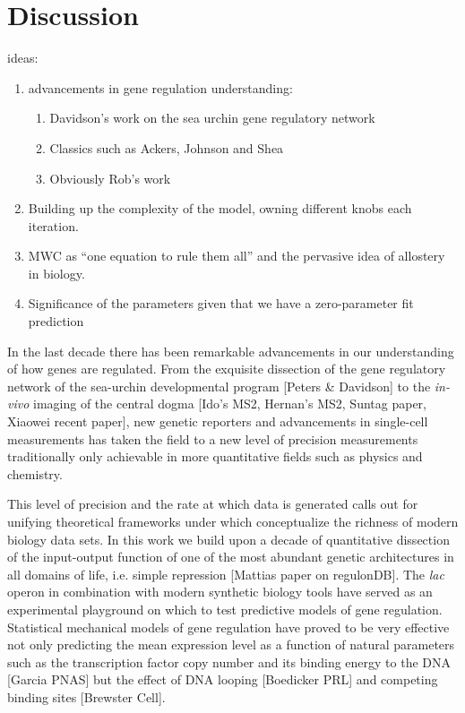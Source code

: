 \pagebreak
\section*{Discussion }

ideas:
\begin{enumerate}
  \item advancements in gene regulation understanding:
    \begin{enumerate}
      \item Davidson's work on the sea urchin gene regulatory network
      \item Classics such as Ackers, Johnson and Shea
      \item Obviously Rob's work
    \end{enumerate}
  \item Building up the complexity of the model, owning different knobs each
  iteration.
  \item MWC as ``one equation to rule them all'' and the pervasive idea of
  allostery in biology.
  \item Significance of the parameters given that we have a zero-parameter fit
  prediction
\end{enumerate}

In the last decade there has been remarkable advancements in our  understanding
of how genes are regulated. From the exquisite dissection of the gene regulatory
network of the sea-urchin developmental program [Peters & Davidson] to the
\textit{in-vivo}  imaging of the central dogma [Ido's MS2, Hernan's MS2, Suntag
paper, Xiaowei recent paper], new genetic reporters and  advancements in
single-cell measurements has taken the field to a new level of precision
measurements traditionally only achievable in more quantitative fields such as
physics and chemistry.

This level of precision and the rate at which data is generated calls out for
unifying theoretical frameworks under which conceptualize the richness of modern
biology data sets. In this work we build upon a decade of quantitative
dissection of the input-output function of one of the most abundant genetic
architectures in all domains of life, i.e. simple repression [Mattias paper on
regulonDB]. The \textit{lac} operon in combination with modern synthetic biology
tools have served as an experimental playground on which to test predictive
models of gene regulation. Statistical mechanical models of gene regulation have
proved to be very effective not only predicting the mean expression level as a
function of natural parameters such as the transcription factor copy number and
its binding energy to the DNA [Garcia PNAS] but the effect of DNA looping
[Boedicker PRL] and competing binding sites [Brewster Cell].

